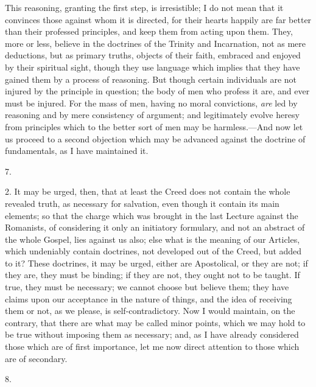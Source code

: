 This reasoning, granting the first step, is irresistible; I do not
mean that it convinces those against whom it is directed, for their
hearts happily are far better than their professed principles, and
keep them from acting upon them. They, more or less, believe in the
doctrines of the Trinity and Incarnation, not as mere deductions, but
as primary truths, objects of their faith, embraced and enjoyed by
their spiritual sight, though they use language which implies that
they have gained them by a process of reasoning. But though certain
individuals are not injured by the principle in question; the body of
men who profess it are, and ever must be injured. For the mass of men,
having no moral convictions, \emph{are} led by reasoning and by mere
consistency of argument; and legitimately evolve heresy from
principles which to the better sort of men may be harmless.—And now
let us proceed to a second objection which may be advanced against the
doctrine of fundamentals, as I have maintained it.

7.

2. It may be urged, then, that at least the Creed does not
contain the whole revealed truth, as necessary for salvation, even
though it contain its main elements; so that the charge which was
brought in the last Lecture against the Romanists, of considering it
only an initiatory formulary, and not an abstract of the whole Gospel,
lies against us also; else what is the meaning of our Articles, which
undeniably contain doctrines, not developed out of the Creed, but
added to it? These doctrines, it may be urged, either are Apostolical,
or they are not; if they are, they must be binding; if they are not,
they ought not to be taught. If true, they must be necessary; we
cannot choose but believe them; they have claims upon our acceptance
in the nature of things, and the idea of receiving them or not, as we
please, is self-contradictory. Now I would maintain, on the contrary,
that there are what may be called minor points, which we may hold to
be true without imposing them as necessary; and, as I have already
considered those which are of first importance, let me now direct
attention to those which are of secondary.

8.

